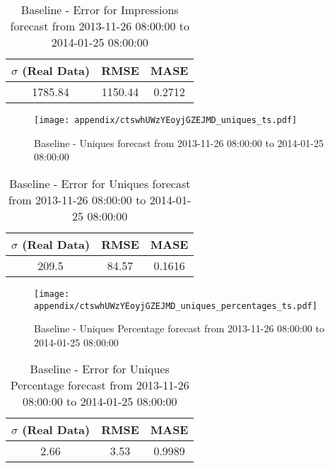 \begin{table}[H]
\centering
\footnotesize
\begin{tabular}{ccc}
$\sigma$ (Real Data) & RMSE & MASE   \\ \hline
1785.84 & 1150.44 & 0.2712 \\
\end{tabular}

\vspace{0.5cm}

\caption[]{
Baseline - Error for Impressions forecast from 2013-11-26 08:00:00 to 2014-01-25 08:00:00}
\end{table}

\begin{figure}[H] \begin{center} \leavevmode
\texttt{[image: appendix/ctswhUWzYEoyjGZEJMD\_uniques\_ts.pdf]} \caption[]{
Baseline - Uniques forecast from 2013-11-26 08:00:00 to 2014-01-25 08:00:00} \label{fig:appendix/ctswhUWzYEoyjGZEJMD_uniques_ts.pdf} \end{center}
\end{figure}

\begin{table}[H]
\centering
\footnotesize
\begin{tabular}{ccc}
$\sigma$ (Real Data) & RMSE & MASE   \\ \hline
209.5 & 84.57 & 0.1616 \\
\end{tabular}

\vspace{0.5cm}

\caption[]{
Baseline - Error for Uniques forecast from 2013-11-26 08:00:00 to 2014-01-25 08:00:00}
\end{table}

\begin{figure}[H] \begin{center} \leavevmode
\texttt{[image: appendix/ctswhUWzYEoyjGZEJMD\_uniques\_percentages\_ts.pdf]} \caption[]{
Baseline - Uniques Percentage forecast from 2013-11-26 08:00:00 to 2014-01-25 08:00:00} \label{fig:appendix/ctswhUWzYEoyjGZEJMD_uniques_percentages_ts.pdf} \end{center}
\end{figure}

\begin{table}[H]
\centering
\footnotesize
\begin{tabular}{ccc}
$\sigma$ (Real Data) & RMSE & MASE   \\ \hline
2.66 & 3.53 & 0.9989 \\
\end{tabular}

\vspace{0.5cm}

\caption[]{
Baseline - Error for Uniques Percentage forecast from 2013-11-26 08:00:00 to 2014-01-25 08:00:00}
\end{table}

